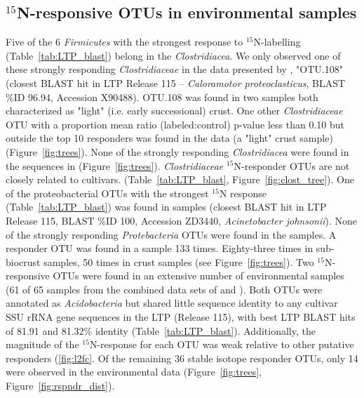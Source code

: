 \subsection{$^{15}$N-responsive OTUs in  environmental samples}
Five of the 6 \textit{Firmicutes} with the strongest response to
$^{15}$N-labelling (Table~\ref{tab:LTP_blast}) belong in the
\textit{Clostridiacea}. We only observed one of these strongly responding
\textit{Clostridiaceae} in the data presented by \citet{Garcia_Pichel_2013},
"OTU.108" (closest BLAST hit in LTP Release 115 -- \textit{Caloramotor
proteoclasticus}, BLAST \%ID 96.94, Accession X90488).  OTU.108 was found in
two samples both characterized as "light" (i.e. early successional) crust. One
other \textit{Clostridiaceae} OTU with a proportion mean ratio
(labeled:control) p-value less than 0.10 but outside the top 10 responders was
found in the \citet{Garcia_Pichel_2013} data (a "light" crust sample)
(Figure~\ref{fig:trees}). None of the strongly responding
\textit{Clostridiacea} were found in the sequences in
\citet{Steven_2013} (Figure~\ref{fig:trees}). \textit{Clostridiaceae}
$^{15}$N-responder OTUs are not closely related to cultivars.
(Table~\ref{tab:LTP_blast}, Figure~\ref{fig:clost_tree}). One of the
proteobacterial OTUs with the strongest $^{15}$N response
(Table~\ref{tab:LTP_blast}) was found in \citet{Garcia_Pichel_2013} samples
(closest BLAST hit in LTP Release 115, BLAST \%ID 100, Accession ZD3440,
\textit{Acinetobacter johnsonii}). None of the strongly responding
\textit{Protebacteria} OTUs were found in the \citet{Steven_2013} samples.
A responder OTU was found in a \citet{Steven_2013} sample 133 times. 
Eighty-three times in sub-biocrust samples, 50 times in crust samples (see
Figure~\ref{fig:trees}). Two $^{15}$N-responsive OTUs were found in an
extensive number of environmental samples (61 of 65 samples from the combined
data sets of \citet{Garcia_Pichel_2013} and \citet{Steven_2013}).  Both OTUs
were annotated as \textit{Acidobacteria} but shared little sequence identity to
any cultivar SSU rRNA gene sequences in the LTP (Release 115), with best LTP
BLAST hits of 81.91 and 81.32\% identity (Table~\ref{tab:LTP_blast}).
Additionally, the magnitude of the $^{15}$N-response for each OTU was weak
relative to other putative responders (\ref{fig:l2fc}. Of the remaining 36
stable isotope responder OTUs, only 14 were observed in the environmental data
(Figure~\ref{fig:trees}, Figure~\ref{fig:rspndr_dist}).

